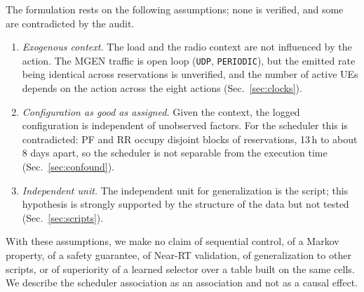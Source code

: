 The formulation rests on the following assumptions; none is verified, and some are contradicted by the audit.%
\begin{enumerate}
  \item[(A1)] \emph{Exogenous context.} The load and the radio context are not influenced by the action. The MGEN traffic is open loop (\texttt{UDP}, \texttt{PERIODIC}), but the emitted rate being identical across reservations is unverified, and the number of active UEs depends on the action across the eight actions (Sec.~\ref{sec:clocks}).%
  \item[(A2)] \emph{Configuration as good as assigned.} Given the context, the logged configuration is independent of unobserved factors. For the scheduler this is contradicted: PF and RR occupy disjoint blocks of reservations, 13\,h to about 8 days apart, so the scheduler is not separable from the execution time (Sec.~\ref{sec:confound}).%
  \item[(A3)] \emph{Independent unit.} The independent unit for generalization is the script; this hypothesis is strongly supported by the structure of the data but not tested (Sec.~\ref{sec:scripts}).%
\end{enumerate}

With these assumptions, we make no claim of sequential control, of a Markov property, of a safety guarantee, of Near-RT validation, of generalization to other scripts, or of superiority of a learned selector over a table built on the same cells.%
We describe the scheduler association as an association and not as a causal effect.%
